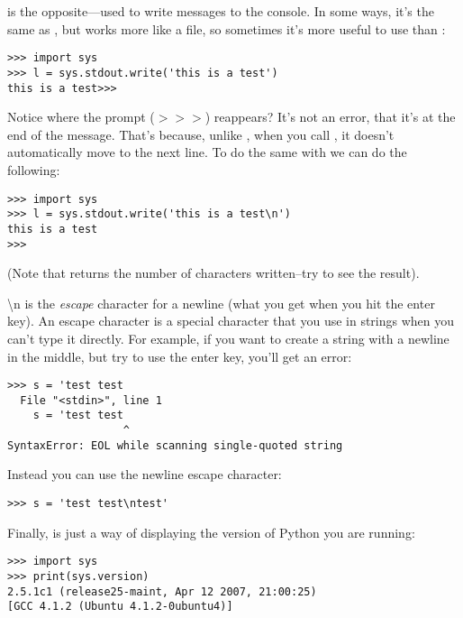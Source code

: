  is the opposite---used to write messages to the console. In some ways, it's the same as , but works more like a file, so sometimes it's more useful to use  than :

\begin{Verbatim}[frame=single]
>>> import sys
>>> l = sys.stdout.write('this is a test')
this is a test>>>
\end{Verbatim}

Notice where the prompt ($>>>$) reappears?  It's not an error, that it's at the end of the message.  That's because, unlike , when you call , it doesn't automatically move to the next line. To do the same with  we can do the following:

\begin{Verbatim}[frame=single]
>>> import sys
>>> l = sys.stdout.write('this is a test\n')
this is a test
>>>
\end{Verbatim}

\noindent
(Note that  returns the number of characters written--try  to see the result).

\noindent
{\textbackslash}n is the \emph{escape} character for a newline (what you get when you hit the enter key).  An escape character is a special character that you use in strings when you can't type it directly. For example, if you want to create a string with a newline in the middle, but try to use the enter key, you'll get an error:

\begin{Verbatim}[frame=single]
>>> s = 'test test
  File "<stdin>", line 1
    s = 'test test
                  ^
SyntaxError: EOL while scanning single-quoted string
\end{Verbatim}

Instead you can use the newline escape character:
\begin{Verbatim}[frame=single]
>>> s = 'test test\ntest'
\end{Verbatim}

\noindent
Finally,  is just a way of displaying the version of Python you are running:

\begin{Verbatim}[frame=single]
>>> import sys
>>> print(sys.version)
2.5.1c1 (release25-maint, Apr 12 2007, 21:00:25)
[GCC 4.1.2 (Ubuntu 4.1.2-0ubuntu4)]
\end{Verbatim}

